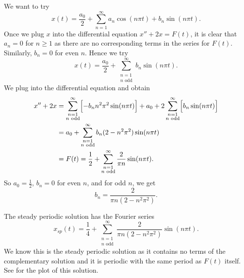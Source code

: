 \begin{example}
We want to try
\begin{equation*}
x(t) = \frac{a_0}{2} + \sum_{n=1}^\infty
a_n \cos (n \pi t) +
b_n \sin (n \pi t) .
\end{equation*}
Once we plug $x$ into the differential equation $x''+2x = F(t)$,
it is clear that $a_n = 0$ for $n \geq 1$ as there are no corresponding terms
in the series for
$F(t)$.  Similarly, $b_n = 0$ for even $n$.  Hence we try
\begin{equation*}
x(t) = \frac{a_0}{2} +
\sum_{\substack{n=1 \\ n \text{ odd}}}^\infty
b_n \sin (n \pi t) .
\end{equation*}
We plug into the differential equation and obtain
\begin{equation*}
\begin{split}
x'' + 2 x & =
\sum_{\substack{n=1 \\ n \text{ odd}}}^\infty
\Bigl[ - b_n n^2 \pi^2 \sin (n \pi t) \Bigr] + 
a_0 +
2
\sum_{\substack{n=1 \\ n \text{ odd}}}^\infty
\Bigl[ b_n \sin (n \pi t) \Bigr]
\\
& =
a_0 +
\sum_{\substack{n=1 \\ n \text{ odd}}}^\infty
b_n (2 - n^2 \pi^2 ) \sin (n \pi t)
\\
& =
F(t) = \frac{1}{2} + \sum_{\substack{n=1 \\ n \text{ odd}}}^\infty
\frac{2}{\pi n} \sin (n \pi t) .
\end{split}
\end{equation*}
So $a_0 = \frac{1}{2}$, $b_n = 0$ for even $n$, and for odd $n$, we
get
\begin{equation*}
b_n = 
\frac{2}{\pi n (2 - n^2 \pi^2 )} .
\end{equation*}

The steady periodic solution has the Fourier series
\begin{equation*}
x_{sp}(t) = \frac{1}{4} + \sum_{\substack{n=1 \\ n \text{ odd}}}^\infty
\frac{2}{\pi n (2 - n^2 \pi^2 )}
\sin (n \pi t) .
\end{equation*}
We know this is the steady periodic solution as it contains no terms 
of the complementary solution and it is periodic with the same period as
$F(t)$ itself.  See  for the plot of this solution.
\begin{myfig}
\capstart
{}
\caption{Plot of the steady periodic solution $x_{sp}$ of
.%
\label{afs:steadyexfig}}
\end{myfig}
\end{example}

